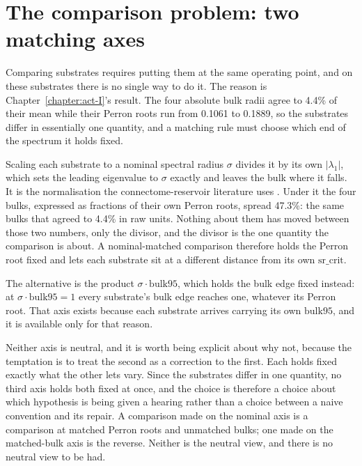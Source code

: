 \section{The comparison problem: two matching axes}
\label{sec:methods-matching}
\bigskip

Comparing substrates requires putting them at the same operating point, and on
these substrates there is no single way to do it. The reason is
Chapter~\ref{chapter:act-I}'s result. The four absolute bulk radii agree to
4.4\% %
of their mean while their Perron roots run from
0.1061 to 0.1889, %
so the substrates differ in essentially one quantity, and a matching rule must
choose which end of the spectrum it holds fixed.

Scaling each substrate to a nominal spectral radius $\sigma$ divides it by its
own $|\lambda_1|$, which sets the leading eigenvalue to $\sigma$ exactly and
leaves the bulk where it falls. It is the normalisation the connectome-reservoir
literature uses \cite{suarez2021learning, suarez2024connectome,
milisav2026neuromorphic}. Under it the four bulks, expressed as fractions of
their own Perron roots, spread
47.3\%: %
the same bulks that agreed to 4.4\% in raw units. Nothing about them has moved
between those two numbers, only the divisor, and the divisor is the one quantity
the comparison is about. A nominal-matched comparison therefore holds the Perron
root fixed and lets each substrate sit at a different distance from its own
$\mathrm{sr\_crit}$.

The alternative is the product $\sigma \cdot \mathrm{bulk95}$, which holds the
bulk edge fixed instead: at $\sigma \cdot \mathrm{bulk95} = 1$ every substrate's
bulk edge reaches one, whatever its Perron root. That axis exists because each
substrate arrives carrying its own $\mathrm{bulk95}$, and it is available only
for that reason.

Neither axis is neutral, and it is worth being explicit about why not, because
the temptation is to treat the second as a correction to the first. Each holds
fixed exactly what the other lets vary. Since the substrates differ in one
quantity, no third axis holds both fixed at once, and the choice is therefore a
choice about which hypothesis is being given a hearing rather than a choice
between a naive convention and its repair. A comparison made on the nominal axis
is a comparison at matched Perron roots and unmatched bulks; one made on the
matched-bulk axis is the reverse. Neither is the neutral view, and there is no
neutral view to be had.

